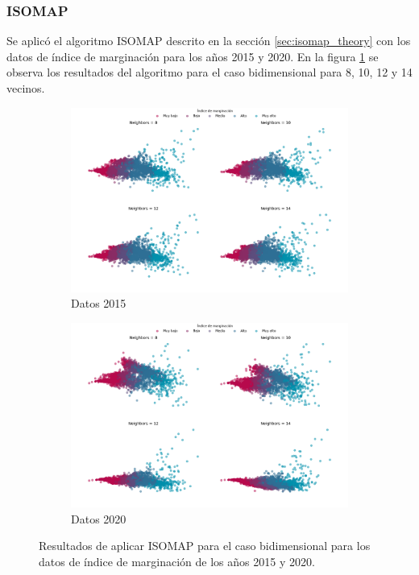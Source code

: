 \subsubsection{ISOMAP}

Se aplicó el algoritmo ISOMAP descrito en la sección \ref{sec:isomap_theory} con los datos de índice de marginación para los años 2015 y 2020. En la figura \ref{fig:isompa_2d} se observa los resultados del algoritmo para el caso bidimensional para 8, 10, 12 y 14 vecinos.

\begin{figure}[H]
    \centering
    \begin{subfigure}{8.4cm}
        \includegraphics[width=1\linewidth]{Graphics/Data_2015/ISOMAP_2D.png}
        \caption{Datos 2015}
    \end{subfigure}
    \begin{subfigure}{8.4cm}
        \includegraphics[width=1\linewidth]{Graphics/Data_2020/ISOMAP_2D.png}
        \caption{Datos 2020}
    \end{subfigure}
    \caption{Resultados de aplicar ISOMAP para el caso bidimensional para los datos de índice de marginación de los años 2015 y 2020.}
    \label{fig:isompa_2d}
\end{figure}

